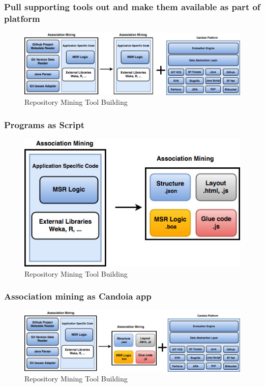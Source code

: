         \begin{frame}
            \frametitle{Pull supporting tools out and make them available as part of platform}
            \begin{figure}
                \centering
                \includegraphics[width=0.75\linewidth]{figures/candoia_idea_overview.jpg}
                \caption{Repository Mining Tool Building}
            \end{figure}
        \end{frame}


        \begin{frame}
            \frametitle{Programs as Script}
            \begin{figure}
                \centering
                \includegraphics[scale=0.25]{figures/programtoscript.jpg}
                \caption{Repository Mining Tool Building}
            \end{figure}
        \end{frame}

        \begin{frame}
            \frametitle{Association mining as Candoia app}
            \begin{figure}
                \centering
                \includegraphics[width=0.75\linewidth]{figures/programstoscriptincandoia.jpg}
                \caption{Repository Mining Tool Building}
            \end{figure}
        \end{frame}


